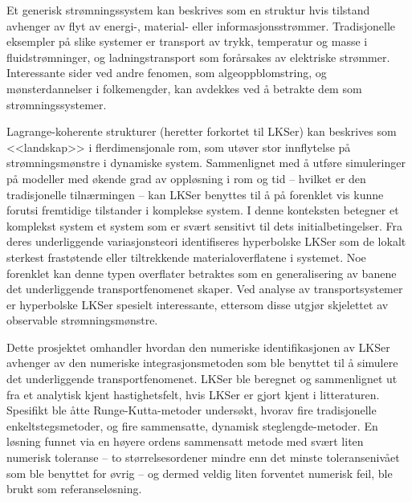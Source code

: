Et generisk strømningssystem kan beskrives som en struktur hvis tilstand
avhenger av flyt av energi-, material- eller informasjonsstrømmer. Tradisjonelle
eksempler på slike systemer er transport av trykk, temperatur og masse i
fluidstrømninger, og ladningstransport som forårsakes av elektriske strømmer.
Interessante sider ved andre fenomen, som algeoppblomstring, og mønsterdannelser
i folkemengder, kan avdekkes ved å betrakte dem som strømningssystemer.

Lagrange-koherente strukturer (heretter forkortet til LKSer) kan beskrives som
<<landskap>> i flerdimensjonale rom, som utøver stor innflytelse på
strømningsmønstre i dynamiske system.
Sammenlignet med å utføre simuleringer på modeller med økende grad av oppløsning
i rom og tid -- hvilket er den tradisjonelle tilnærmingen -- kan LKSer benyttes
til å på forenklet vis kunne forutsi fremtidige tilstander i komplekse system.
I denne konteksten betegner et komplekst system et system som er svært sensitivt
til dets initialbetingelser.
Fra deres underliggende variasjonsteori identifiseres hyperbolske LKSer som de
lokalt sterkest frastøtende eller tiltrekkende materialoverflatene i systemet.
Noe forenklet kan denne typen overflater betraktes som en generalisering av
banene det underliggende transportfenomenet skaper. Ved analyse av
transportsystemer er hyperbolske LKSer spesielt interessante, ettersom disse
utgjør skjelettet av observable strømningsmønstre.

Dette prosjektet omhandler hvordan den numeriske identifikasjonen av LKSer
avhenger av den numeriske integrasjonsmetoden som ble benyttet til å simulere
det underliggende transportfenomenet.
LKSer ble beregnet og sammenlignet ut fra et analytisk
kjent hastighetsfelt, hvis LKSer er gjort kjent i litteraturen. Spesifikt
ble åtte Runge-Kutta-metoder undersøkt, hvorav fire tradisjonelle
enkeltstegsmetoder, og fire sammensatte, dynamisk steglengde-metoder. En
løsning funnet via en høyere ordens sammensatt metode med svært liten
numerisk toleranse -- to størrelsesordener mindre enn det minste toleransenivået
som ble benyttet for
øvrig -- og dermed veldig liten forventet numerisk feil, ble brukt som
referanseløsning.%

